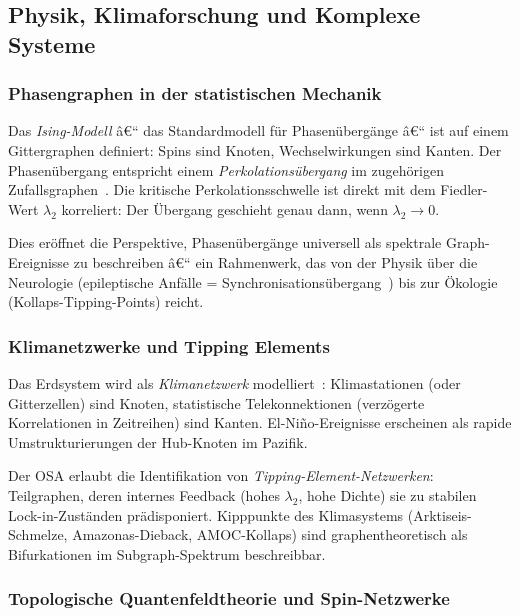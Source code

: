 ﻿\documentclass[12pt,a4paper,twoside]{article}
\theoremstyle{definition}
\theoremstyle{plain}
\theoremstyle{remark}
\begin{document}
\subsection{Physik, Klimaforschung und Komplexe Systeme}
\label{sub:physik}

\subsubsection{Phasengraphen in der statistischen Mechanik}

Das \emph{Ising-Modell} â€“ das Standardmodell für
Phasenübergänge â€“ ist auf einem Gittergraphen definiert:
Spins sind Knoten, Wechselwirkungen sind Kanten.
Der Phasenübergang entspricht einem \emph{Perkolationsübergang}
im zugehörigen Zufallsgraphen~\cite{Erdos1960}.  Die
kritische Perkolationsschwelle ist direkt mit dem
Fiedler-Wert $\lambda_2$ korreliert: Der Übergang
geschieht genau dann, wenn $\lambda_2 \to 0$.

Dies eröffnet die Perspektive, Phasenübergänge universell
als spektrale Graph-Ereignisse zu beschreiben â€“ ein Rahmenwerk,
das von der Physik über die Neurologie (epileptische
Anfälle = Synchronisationsübergang~\cite{Strogatz2001})
bis zur Ökologie (Kollaps-Tipping-Points) reicht.

\subsubsection{Klimanetzwerke und Tipping Elements}

Das Erdsystem wird als \emph{Klimanetzwerk} modelliert~\cite{Donges2009}:
Klimastationen (oder Gitterzellen) sind Knoten, statistische
Telekonnektionen (verzögerte Korrelationen in Zeitreihen)
sind Kanten.  El-Niño-Ereignisse erscheinen als
rapide Umstrukturierungen der Hub-Knoten im Pazifik.

Der OSA erlaubt die Identifikation von \emph{Tipping-Element-Netzwerken}:
Teilgraphen, deren internes Feedback (hohes $\lambda_2$,
hohe Dichte) sie zu stabilen Lock-in-Zuständen prädisponiert.
Kipppunkte des Klimasystems (Arktiseis-Schmelze,
Amazonas-Dieback, AMOC-Kollaps) sind graphentheoretisch
als Bifurkationen im Subgraph-Spektrum beschreibbar.

\subsubsection{Topologische Quantenfeldtheorie und Spin-Netzwerke}
\end{document}
